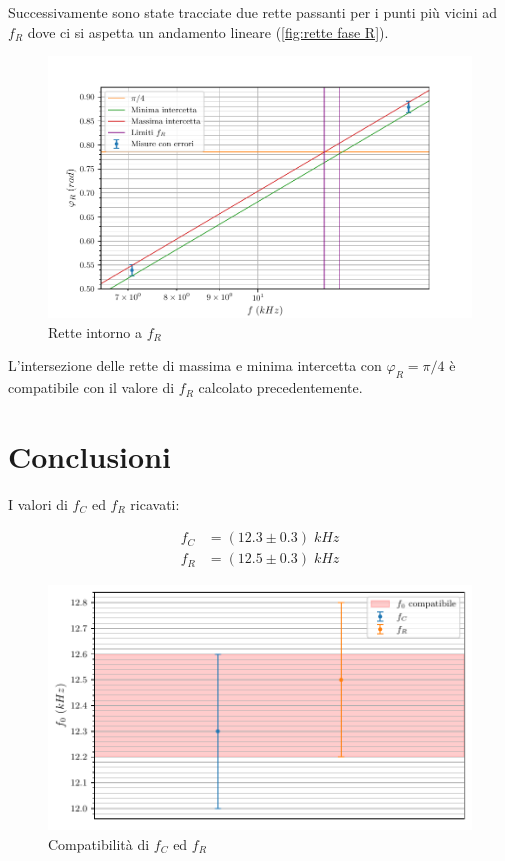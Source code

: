 \documentclass[11pt, a4paper]{article}
\numberwithin{equation}{section} %
\begin{document}
\newpage

Successivamente sono state tracciate due rette passanti per i punti più vicini ad $f_{R}$ dove ci si aspetta un andamento lineare (\autoref{fig:rette fase R}).

\begin{figure}[ht!]
    \includegraphics{onda_sin_phi(f)_R_intercette.pdf}
    \caption{Rette intorno a $f_{R}$}
    \label{fig:rette fase R}
\end{figure}

\newpage

L'intersezione delle rette di massima e minima intercetta con $\varphi_{R} = \pi/4$ è compatibile con il valore di $f_{R}$ calcolato precedentemente.

\section{Conclusioni}

I valori di $f_{C}$ ed $f_{R}$ ricavati:

\begin{align*}
    f_{C} &= (12.3 \pm 0.3) \; kHz \\
    f_{R} &= (12.5 \pm 0.3) \; kHz
\end{align*}

\begin{figure}[ht!]
    \includegraphics{f_0_compatibili.pdf}
    \caption{Compatibilità di $f_{C}$ ed $f_{R}$}
    \label{fig:fC ed fR compatibili}
\end{figure}
\end{document}
